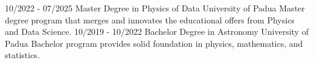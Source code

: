 \documentclass[9pt]{developercv} %
\begin{document}
\vspace{-10 pt}
\begin{entrylist}
    \entry
		{10/2022 - 07/2025}
		{Master Degree in Physics of Data }
		{University of Padua}
		{Master degree program that merges and innovates the educational offers from Physics and Data Science.}
    \entry
		{10/2019 - 10/2022}
		{Bachelor Degree in Astronomy}
		{University of Padua}
		{Bachelor program provides solid foundation in physics, mathematics, and statistics.}

\end{entrylist}

\end{document}
